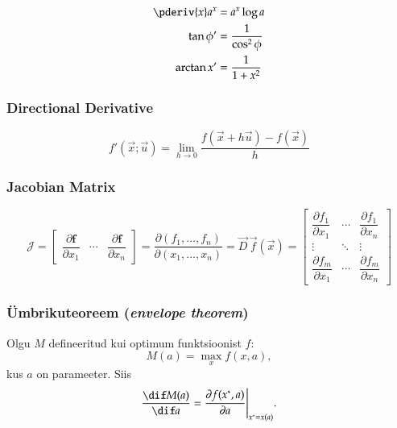 \documentclass[a4paper]{article}
\numberwithin{equation}{subsection}
\begin{document}
\begin{align}
  \pderiv{x} a^{x} &= a^{x} \log a
  \\
  \tan \phi' &= \frac{1}{\cos^2 \phi} 
  \\
  \arctan x' &= \frac{1}{1+x^2}
\end{align}


\subsubsection{Directional Derivative}

\begin{equation}
  f'(\vec{x}; \vec{u})
  =
  \lim_{h \to 0}
  \frac{f(\vec{x} + h\vec{u}) - f(\vec{x})}
  {h}
\end{equation}


\subsubsection{Jacobian Matrix}
\label{sec:jacobian_matrix}

\begin{equation}
  \mathcal{J} = 
  \begin{bmatrix}
    \dfrac{\partial \mathbf{f}}{\partial x_1} & \cdots &
    \dfrac{\partial \mathbf{f}}{\partial x_n} 
  \end{bmatrix}
  = 
  \frac{\partial (f_1, \dots, f_n)}
  {\partial (x_1, \dots, x_n)}
  =
  \vec{D}\,\vec{f}(\vec{x})
  =
  \begin{bmatrix}
    \dfrac{\partial f_1}{\partial x_1} & \cdots & \dfrac{\partial f_1}{\partial x_n}\\
    \vdots & \ddots & \vdots\\
    \dfrac{\partial f_m}{\partial x_1} & \cdots & \dfrac{\partial
      f_m}{\partial x_n} 
  \end{bmatrix}
\end{equation}



\subsubsection{Ümbrikuteoreem  (\emph{{envelope theorem}})}
\label{sec:envelope_theorem}

Olgu $M$ defineeritud kui optimum funktsioonist $f$:
\begin{equation}
  M(a) = \max_{x} f(x, a),
\end{equation}
kus $a$ on parameeter.  Siis
\begin{equation}
  \frac{\dif M(a)}{\dif a} =  \frac{\partial f(x^*, a)}{ \partial a} \Bigg|_{x^* = x(a)}.
\end{equation}
\end{document}
